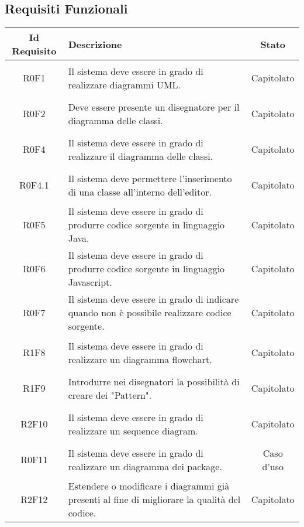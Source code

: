 \documentclass[../AnalisiDeiRequisiti.tex]{subfiles}
\begin{document}
\newpage
\subsection{Requisiti Funzionali}
\normalsize
\begin{longtable}{|c|>{\centering}p{7cm}|c|}
	\hline
	\textbf{Id Requisito} & \textbf{Descrizione} & \textbf{Stato}\\
	\hline
	\endhead
	\hypertarget{R0F1}{R0F1} & Il sistema deve essere in grado di realizzare diagrammi UML. & Capitolato \\ \hline
	\hypertarget{R0F2}{R0F2} & Deve essere presente un disegnatore per il diagramma delle classi. & Capitolato \\ \hline
	\hypertarget{R0F4}{R0F4} & Il sistema deve essere in grado di realizzare il diagramma delle classi. & Capitolato \\ \hline
	\hypertarget{R0F4.1}{R0F4.1} & Il sistema deve permettere l'inserimento di una classe all'interno dell'editor. & Capitolato \\ \hline
	\hypertarget{R0F5}{R0F5} & Il sistema deve essere in grado di produrre codice sorgente in linguaggio Java. & Capitolato \\ \hline
	\hypertarget{R0F6}{R0F6} & Il sistema deve essere in grado di produrre codice sorgente in linguaggio Javascript. & Capitolato \\ \hline
	\hypertarget{R0F7}{R0F7} & Il sistema deve essere in grado di indicare quando non è possibile realizzare codice sorgente. & Capitolato \\ \hline
	\hypertarget{R1F8}{R1F8} & Il sistema deve essere in grado di realizzare un diagramma flowchart. & Capitolato \\ \hline
	\hypertarget{R1F9}{R1F9} & Introdurre nei disegnatori la possibilità di creare dei "Pattern". & Capitolato \\ \hline
	\hypertarget{R2F10}{R2F10} & Il sistema deve essere in grado di realizzare un sequence diagram. & Capitolato \\ \hline
	\hypertarget{R0F11}{R0F11} & Il sistema deve essere in grado di realizzare un diagramma dei package. & Caso d'uso \\ \hline
	\hypertarget{R2F12}{R2F12} & Estendere o modificare i diagrammi già presenti al fine di migliorare la qualità del codice. & Capitolato \\ \hline

\end{longtable}
\end{document}
